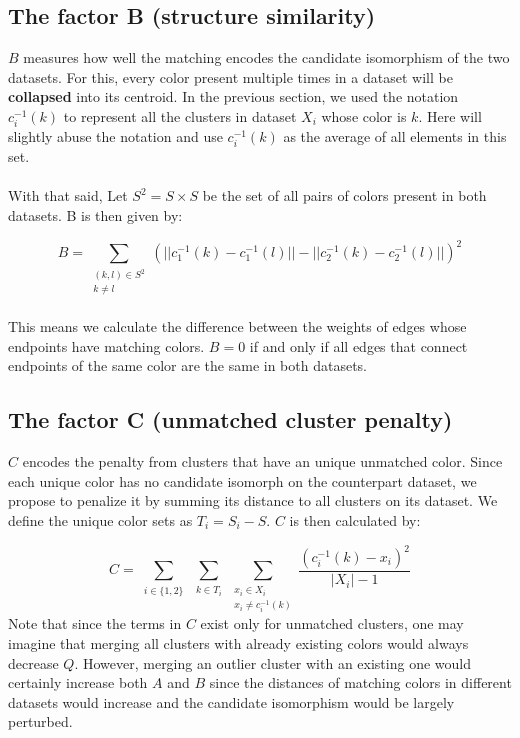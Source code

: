 \documentclass[11pt]{article}
\begin{document}
\subsection{The factor B (structure similarity)}
$B$ measures how well the matching encodes the candidate isomorphism of the two datasets. For this, every color present multiple times in a dataset will be \textbf{collapsed} into its centroid. In the previous section, we used the notation $c_{i}^{-1} (k)$ to represent all the clusters in dataset $X_i$ whose color is $k$. Here will slightly abuse the notation and use $c_{i}^{-1} (k)$ as the average of all elements in this set.\\
\\
With that said, Let $S^2 = S\times S$ be the set of all pairs of colors present in both datasets. B is then given by:

$$
B = \sum_{\substack{(k,l) \in S^2 \\ k \neq l}} (||c_{1}^{-1}(k) - c_{1}^{-1} (l)|| - ||c_{2}^{-1}(k) - c_{2}^{-1} (l)||)^2
$$
\\
This means we calculate the difference between the weights of edges whose endpoints have matching colors. $B=0$ if and only if all edges that connect endpoints of the same color are the same in both datasets. 

\subsection{The factor C (unmatched cluster penalty)}
$C$ encodes the penalty from clusters that have an unique unmatched color. Since each unique color has no candidate isomorph on the counterpart dataset, we propose to penalize it by summing its distance to all clusters on its dataset. We define the unique color sets as $T_i = S_i - S$. $C$ is then calculated by:

$$
C = \sum_{\substack{i \in \{1,2\}}} \sum_{\substack{k \in T_i}} \sum_{\substack{x_i \in X_i \\ x_i \neq c_{i}^{-1}(k) }} \frac{ (c_{i}^{-1} (k) - x_i)^2}{|X_i| - 1}
$$
Note that since the terms in $C$ exist only for unmatched clusters, one may imagine that merging all clusters with already existing colors would always decrease $Q$. However, merging an outlier cluster with an existing one would certainly increase both $A$ and $B$ since the distances of matching colors in different datasets would increase and the candidate isomorphism would be largely perturbed. 
\end{document}
